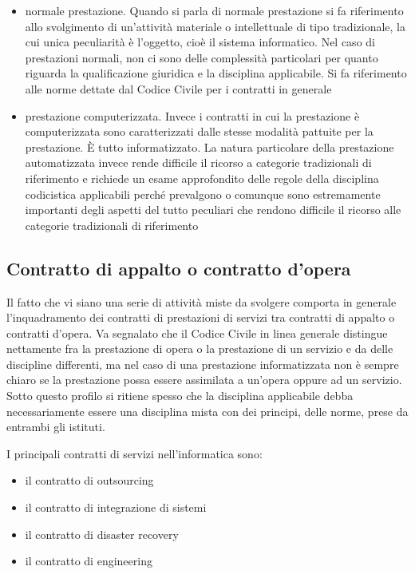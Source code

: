  \begin{itemize}
    \item normale prestazione. Quando si parla di normale prestazione si fa riferimento allo svolgimento di un'attività materiale o intellettuale di tipo tradizionale, la cui unica peculiarità è l'oggetto, cioè il sistema informatico. Nel caso di prestazioni normali, non ci sono delle complessità particolari per quanto riguarda la qualificazione giuridica e la disciplina applicabile. Si fa riferimento alle norme dettate dal Codice Civile per i contratti in generale
    \item prestazione computerizzata. Invece i contratti in cui la prestazione è computerizzata sono caratterizzati dalle stesse modalità pattuite per la prestazione. È tutto informatizzato. La natura particolare della prestazione automatizzata invece rende difficile il ricorso a categorie tradizionali di riferimento e richiede un esame approfondito delle regole della disciplina codicistica applicabili perché prevalgono o comunque sono estremamente importanti degli aspetti del tutto peculiari che rendono difficile il ricorso alle categorie tradizionali di riferimento
 \end{itemize}

\subsection{Contratto di appalto o contratto d'opera} 
Il fatto che vi siano una serie di attività miste da svolgere comporta in generale l'inquadramento dei contratti di prestazioni di servizi tra contratti di appalto o contratti d'opera. Va segnalato che il Codice Civile in linea generale distingue nettamente fra la prestazione di opera o la prestazione di un servizio e da delle discipline differenti, ma nel caso di una prestazione informatizzata non è sempre chiaro se la prestazione possa essere assimilata a un'opera oppure ad un servizio. Sotto questo profilo si ritiene spesso che la disciplina applicabile debba necessariamente essere una disciplina mista con dei principi, delle norme, prese da entrambi gli istituti. 

I principali contratti di servizi nell'informatica sono:

\begin{itemize}
    \item il contratto di outsourcing
    \item il contratto di integrazione di sistemi
    \item il contratto di disaster recovery
    \item il contratto di engineering
\end{itemize}

